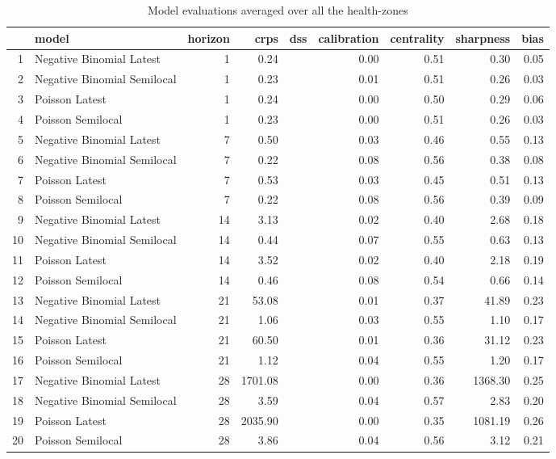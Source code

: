 \begin{table}[ht]
\centering
\begin{tabular}{rlrrrrrrr}
  \hline
 & model & horizon & crps & dss & calibration & centrality & sharpness & bias \\ 
  \hline
1 & Negative Binomial Latest &   1 & 0.24 &  & 0.00 & 0.51 & 0.30 & 0.05 \\ 
  2 & Negative Binomial Semilocal &   1 & 0.23 &  & 0.01 & 0.51 & 0.26 & 0.03 \\ 
  3 & Poisson Latest &   1 & 0.24 &  & 0.00 & 0.50 & 0.29 & 0.06 \\ 
  4 & Poisson Semilocal &   1 & 0.23 &  & 0.00 & 0.51 & 0.26 & 0.03 \\ 
  5 & Negative Binomial Latest &   7 & 0.50 &  & 0.03 & 0.46 & 0.55 & 0.13 \\ 
  6 & Negative Binomial Semilocal &   7 & 0.22 &  & 0.08 & 0.56 & 0.38 & 0.08 \\ 
  7 & Poisson Latest &   7 & 0.53 &  & 0.03 & 0.45 & 0.51 & 0.13 \\ 
  8 & Poisson Semilocal &   7 & 0.22 &  & 0.08 & 0.56 & 0.39 & 0.09 \\ 
  9 & Negative Binomial Latest &  14 & 3.13 &  & 0.02 & 0.40 & 2.68 & 0.18 \\ 
  10 & Negative Binomial Semilocal &  14 & 0.44 &  & 0.07 & 0.55 & 0.63 & 0.13 \\ 
  11 & Poisson Latest &  14 & 3.52 &  & 0.02 & 0.40 & 2.18 & 0.19 \\ 
  12 & Poisson Semilocal &  14 & 0.46 &  & 0.08 & 0.54 & 0.66 & 0.14 \\ 
  13 & Negative Binomial Latest &  21 & 53.08 &  & 0.01 & 0.37 & 41.89 & 0.23 \\ 
  14 & Negative Binomial Semilocal &  21 & 1.06 &  & 0.03 & 0.55 & 1.10 & 0.17 \\ 
  15 & Poisson Latest &  21 & 60.50 &  & 0.01 & 0.36 & 31.12 & 0.23 \\ 
  16 & Poisson Semilocal &  21 & 1.12 &  & 0.04 & 0.55 & 1.20 & 0.17 \\ 
  17 & Negative Binomial Latest &  28 & 1701.08 &  & 0.00 & 0.36 & 1368.30 & 0.25 \\ 
  18 & Negative Binomial Semilocal &  28 & 3.59 &  & 0.04 & 0.57 & 2.83 & 0.20 \\ 
  19 & Poisson Latest &  28 & 2035.90 &  & 0.00 & 0.35 & 1081.19 & 0.26 \\ 
  20 & Poisson Semilocal &  28 & 3.86 &  & 0.04 & 0.56 & 3.12 & 0.21 \\ 
   \hline
\end{tabular}
\caption{Model evaluations averaged over all the health-zones} 
\label{tab:hz_evo}
\end{table}
